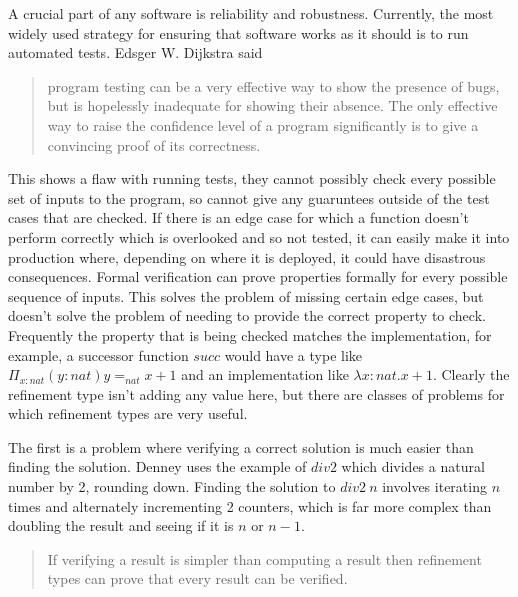 A crucial part of any software is reliability and robustness.
Currently, the most widely used strategy for ensuring that software works as it should
is to run automated tests.
Edsger W. Dijkstra said \cite{dijkstra72}
\begin{quote}
    program testing can be a very effective way to show the presence of bugs, but is
    hopelessly inadequate for showing their absence.
    The only effective way to raise the confidence level of a program significantly is
    to give a convincing proof of its correctness.
\end{quote}
This shows a flaw with running tests, they cannot possibly check every possible set of inputs
to the program, so cannot give any guaruntees outside of the test cases that are checked.
If there is an edge case for which a function doesn't perform correctly which is overlooked
and so not tested, it can easily make it into production where, depending on where it is
deployed, it could have disastrous consequences.
Formal verification can prove properties formally for every possible sequence of inputs.
This solves the problem of missing certain edge cases, but doesn't solve the problem of
needing to provide the correct property to check.
Frequently the property that is being checked matches the implementation, for example,
a successor function $succ$ would have a type like $\Pi_{x:nat} (y:nat) y =_{nat} x+1$
and an implementation like $\lambda x:nat . x+1$.
Clearly the refinement type isn't adding any value here,
but there are classes of problems for which refinement types are very useful.

The first is a problem where verifying a correct solution is much easier than finding
the solution.
Denney uses the example of $div2$ which divides a natural number by 2, rounding down.
Finding the solution to $div2\ n$ involves iterating $n$ times and alternately incrementing
2 counters, which is far more complex than doubling the result and seeing if it is $n$ or
$n-1$.
\begin{quote}
    If verifying a result is simpler than computing a result then refinement types can prove that
    every result can be verified.
\end{quote}

